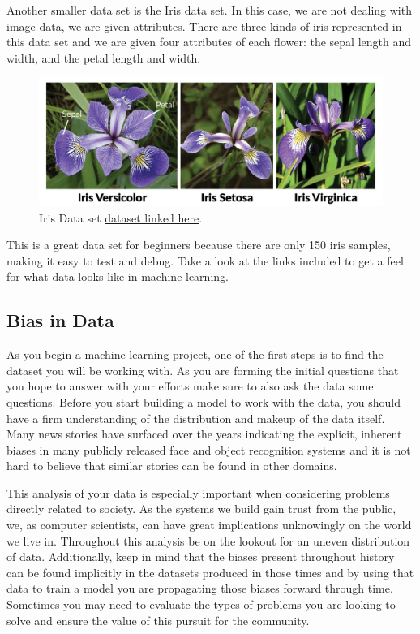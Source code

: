 \documentclass{article}
\begin{document}
\newpage

Another smaller data set is the Iris data set. In this case, we are not dealing with image data, we are given attributes. There are three kinds of iris represented in this data set and we are given four attributes of each flower: the sepal length and width, and the petal length and width.  

\begin{figure}[H]
    \centering
    \includegraphics[width=4.5in]{iris.png}
    \caption{Iris Data set \href{https://archive.ics.uci.edu/ml/datasets/iris}{dataset linked here}.}
    \label{fig:iris}
\end{figure}

This is a great data set for beginners because there are only 150 iris samples, making it easy to test and debug. Take a look at the links included to get a feel for what data looks like in machine learning.

\subsection{Bias in Data}
As you begin a machine learning project, one of the first steps is to find the dataset you will be working with. As you are forming the initial questions that you hope to answer with your efforts make sure to also ask the data some questions. Before you start building a model to work with the data, you should have a firm understanding of the distribution and makeup of the data itself. Many news stories have surfaced over the years indicating the explicit, inherent biases in many publicly released face and object recognition systems and it is not hard to believe that similar stories can be found in other domains. 

This analysis of your data is especially important when considering problems directly related to society. As the systems we build gain trust from the public, we, as computer scientists, can have great implications unknowingly on the world we live in. Throughout this analysis be on the lookout for an uneven distribution of data. Additionally, keep in mind that the biases present throughout history can be found implicitly in the datasets produced in those times and by using that data to train a model you are propagating those biases forward through time. Sometimes you may need to evaluate the types of problems you are looking to solve and ensure the value of this pursuit for the community.
\end{document}
